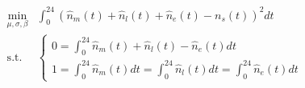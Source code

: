\begin{equation}
\begin{split}
	\min_{\mu, \sigma, \beta}& \int_{0}^{24}\left(\hat{n}_m(t) + \hat{n}_l(t) + \hat{n}_e(t) - n_s(t)\right)^2 dt\\
	\text{s.t.}&
	\begin{cases}
		0 = \int_{0}^{24}\hat{n}_m(t) + \hat{n}_l(t) - \hat{n}_e(t) dt \\
		1 = \int_{0}^{24}\hat{n}_m(t) dt = \int_{0}^{24}\hat{n}_l(t) dt = \int_{0}^{24}\hat{n}_e(t) dt
	\end{cases}
\end{split}
\label{ch6:equ:normal-distribution-minimisation}
\end{equation}